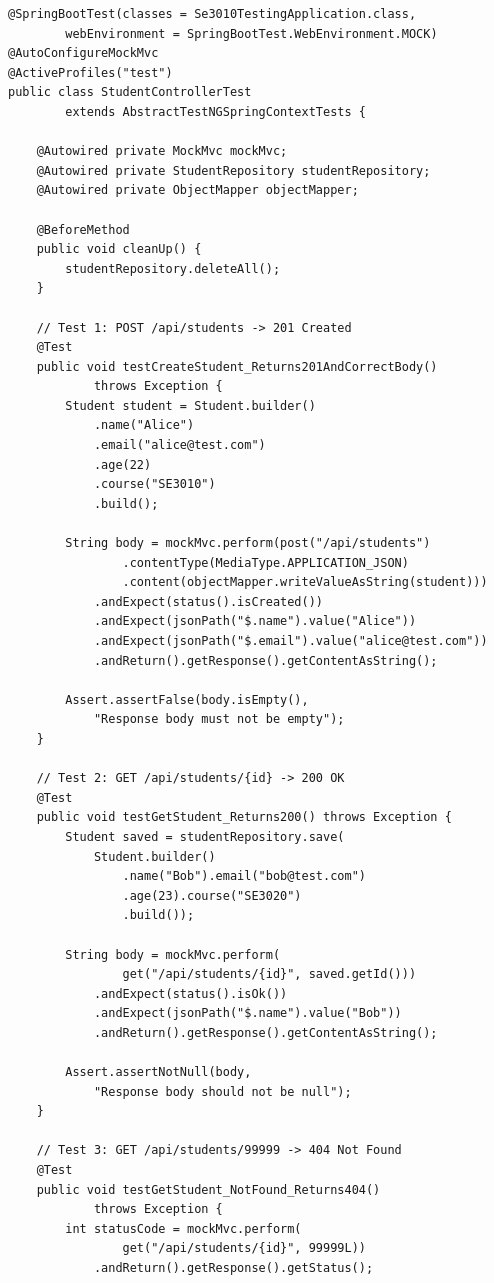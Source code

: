 \documentclass[12pt,a4paper]{article}
\begin{document}
\begin{lstlisting}[style=javastyle, caption={\texttt{StudentControllerTest.java} -- Member 1's assertion tests}]
@SpringBootTest(classes = Se3010TestingApplication.class,
        webEnvironment = SpringBootTest.WebEnvironment.MOCK)
@AutoConfigureMockMvc
@ActiveProfiles("test")
public class StudentControllerTest
        extends AbstractTestNGSpringContextTests {

    @Autowired private MockMvc mockMvc;
    @Autowired private StudentRepository studentRepository;
    @Autowired private ObjectMapper objectMapper;

    @BeforeMethod
    public void cleanUp() {
        studentRepository.deleteAll();
    }

    // Test 1: POST /api/students -> 201 Created
    @Test
    public void testCreateStudent_Returns201AndCorrectBody()
            throws Exception {
        Student student = Student.builder()
            .name("Alice")
            .email("alice@test.com")
            .age(22)
            .course("SE3010")
            .build();

        String body = mockMvc.perform(post("/api/students")
                .contentType(MediaType.APPLICATION_JSON)
                .content(objectMapper.writeValueAsString(student)))
            .andExpect(status().isCreated())
            .andExpect(jsonPath("$.name").value("Alice"))
            .andExpect(jsonPath("$.email").value("alice@test.com"))
            .andReturn().getResponse().getContentAsString();

        Assert.assertFalse(body.isEmpty(),
            "Response body must not be empty");
    }

    // Test 2: GET /api/students/{id} -> 200 OK
    @Test
    public void testGetStudent_Returns200() throws Exception {
        Student saved = studentRepository.save(
            Student.builder()
                .name("Bob").email("bob@test.com")
                .age(23).course("SE3020")
                .build());

        String body = mockMvc.perform(
                get("/api/students/{id}", saved.getId()))
            .andExpect(status().isOk())
            .andExpect(jsonPath("$.name").value("Bob"))
            .andReturn().getResponse().getContentAsString();

        Assert.assertNotNull(body,
            "Response body should not be null");
    }

    // Test 3: GET /api/students/99999 -> 404 Not Found
    @Test
    public void testGetStudent_NotFound_Returns404()
            throws Exception {
        int statusCode = mockMvc.perform(
                get("/api/students/{id}", 99999L))
            .andReturn().getResponse().getStatus();


\end{lstlisting}
\end{document}
